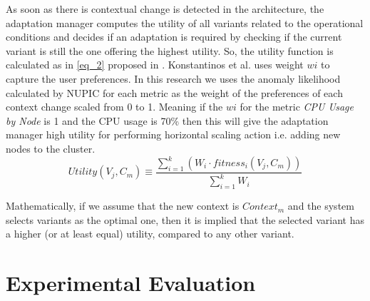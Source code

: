 \documentclass[sigconf]{acmart}
\begin{document}
As soon as there is contextual change is detected in the architecture, the adaptation manager computes the utility of all variants related to the operational conditions and decides if an adaptation is required by checking if the current variant is still the one offering the highest utility. So, the utility function is calculated as in \ref{eq_2} proposed in \cite{KonstantinosKakousis:2008ub}. Konstantinos et al. uses weight $wi$ to capture the user preferences. In this research we uses the anomaly likelihood calculated by NUPIC for each metric as the weight of the preferences of each context change scaled from 0 to 1. Meaning if the $wi$ for the metric \textit{CPU Usage by Node} is 1 and the CPU usage is 70\% then this will give the adaptation manager high utility for performing horizontal scaling action i.e. adding new nodes to the cluster. 
\begin{equation}
\label{eq_2}
    Utility(V_{j},C_{m}) \equiv \frac{ \sum_{i=1}^{k} (W_{i} \cdot fitness_{i}(V_{j},C_{m}) ) }{\sum_{i=1}^{k} W_{i} }
\end{equation}


Mathematically, if we assume that the new context is $Context_{m}$  and the system selects variants as the optimal one, then it is implied that the selected variant has a higher (or at least equal) utility, compared to any other variant.  
 
 
\section{Experimental Evaluation}
\end{document}
